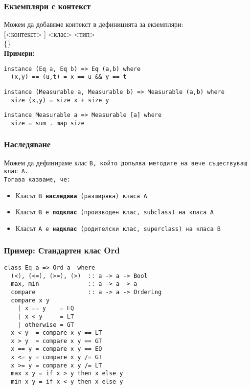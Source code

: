 \documentclass[alsotrans]{beamerswitch}
\begin{document}
\begin{frame}[fragile]
  \frametitle{Екземпляри с контекст}
  Можем да добавяме контекст в дефиницията за екземпляри:\\
   [<контекст> \tta{=>}] <клас> <тип> \\
  \hspace{1em} \{<дефиниция-на-метод>\}\\[2ex]
  \pause
  \textbf{Примери:}
\small
\begin{lstlisting}
instance (Eq a, Eq b) => Eq (a,b) where
  (x,y) == (u,t) = x == u && y == t
\end{lstlisting}
  \pause
\begin{lstlisting}
instance (Measurable a, Measurable b) => Measurable (a,b) where
  size (x,y) = size x + size y
\end{lstlisting}
  \pause
\begin{lstlisting}
instance Measurable a => Measurable [a] where
  size = sum . map size
\end{lstlisting}
\end{frame}

\begin{frame}[fragile]
  \frametitle{Наследяване}
  Можем да дефинираме клас \tt{B}, който допълва методите на вече съществуващ клас \tt{A}.\\
  Тогава казваме, че:
  \begin{itemize}[<+->]
  \item Класът \tt{B} \textbf{наследява} (разширява) класа \tt{A}
  \item Класът \tt{B} е \textbf{подклас} (производен клас, subclass) на класа \tt{A}
  \item Класът \tt{A} е \textbf{надклас} (родителски клас, superclass) на класа \tt{B}
  \end{itemize}
\end{frame}

\begin{frame}[fragile]
  \frametitle{Пример: Стандартен клас Ord}
\lstsmall
\begin{lstlisting}
class Eq a => Ord a  where
  (<), (<=), (>=), (>)  :: a -> a -> Bool
  max, min              :: a -> a -> a
  compare               :: a -> a -> Ordering
  compare x y
    | x == y    = EQ
    | x < y     = LT
    | otherwise = GT
  x < y  = compare x y == LT
  x > y  = compare x y == GT
  x == y = compare x y == EQ
  x <= y = compare x y /= GT
  x >= y = compare x y /= LT
  max x y = if x > y then x else y
  min x y = if x < y then x else y
\end{lstlisting}
\end{frame}
\end{document}
